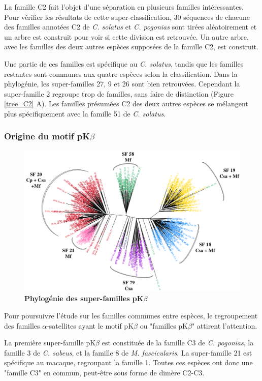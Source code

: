 \documentclass[12pt,a4paper]{article}
\begin{document}
		La famille C2 fait l'objet d'une séparation en plusieurs familles intéressantes. Pour vérifier les résultats de cette super-classification, 30 séquences de chacune des familles annotées C2 de \textit{C. solatus} et \textit{C. pogonias} sont tirées aléatoirement et un arbre est construit pour voir si cette division est retrouvée. Un autre arbre,  avec les familles des deux autres espèces supposées de la famille C2,  est construit.
		
		Une partie de ces familles est spécifique au \textit{C. solatus}, tandis que les familles restantes sont communes aux quatre espèces selon la classification. Dans la phylogénie, les super-familles 27, 9 et 26 sont bien retrouvées. Cependant la super-famille 2 regroupe trop de familles, sans faire de distinction (Figure \ref{tree_C2} A). Les familles présumées C2 des deux autres espèces se mélangent plus spécifiquement avec la famille 51 de \textit{C. solatus}.
						
	\subsubsection{Origine du motif pK$\beta$}
	
	\begin{figure}	
			\centering
				\includegraphics[scale=0.4]{img/pkb_tree.png}				
				\caption{\textbf{Phylogénie des super-familles pK$\beta$}
	\label{fig:pkb_tree}} 
	\end{figure}

	Pour poursuivre l'étude sur les familles communes entre espèces, le regroupement des familles $\alpha$-satellites ayant  le motif pK$\beta$ ou "familles pK$\beta$" attirent l'attention. 
	
	La première super-famille pK$\beta$ est constituée de la famille C3 de \textit{C. pogonias}, la famille 3 de \textit{C. sabeus}, et la famille 8 de \textit{M. fascicularis}. La super-famille 21 est spécifique au macaque, regroupant la famille 1. Toutes ces espèces ont donc une "famille C3" en commun, peut-être sous forme de dimère C2-C3.
	
\end{document}
